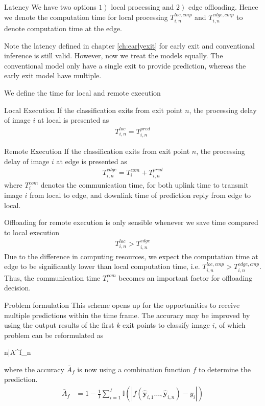 	\begin{enumdescript}
		\item[Latency]  We have two options $ \left.1 \right) $ local processing and $ \left.2\right) $ edge offloading. Hence we denote the computation time for local processing $ T_{i,n}^{loc,cmp} $ and $ T_{i,n}^{edge,cmp} $ to denote computation time at the edge. 
		
		Note the latency defined in chapter \ref{ch:earlyexit} for early exit and conventional inference is still valid. However, now we treat the models equally. The conventional model only have a single exit to provide prediction, whereas the early exit model have multiple.
		
		We define the time for local and remote execution

		\begin{enumdescript}
			\item[Local Execution] If the classification exits from exit point $ n $, the processing delay of image $ i $ at local is presented as
			\begin{align}
			T_{i,n}^{loc}= T_{i,n}^{pred}
			\end{align}
			\item[Remote Execution] If the classification exits from exit point $ n $, the processing delay of image $ i $ at edge is presented as
			\begin{align}
			T_{i,n}^{edge}=T_{i}^{com}+ T_{i,n}^{pred}
			\end{align}
			where $ T^{com}_i $ denotes the communication time, for both uplink time to transmit image $ i $ from local to edge, and downlink time of prediction reply from edge to local.
			
			Offloading for remote execution is only sensible whenever we save time compared to local execution
			\begin{align}
					T_{i,n}^{loc} > T_{i,n}^{edge}
			\end{align}
			Due to the difference in computing resources, we expect the computation time at edge to be significantly lower than local computation time, i.e. $ T_{i,n}^{loc,cmp} > T_{i,n}^{edge,cmp} $. Thus, the communication time $ T^{com}_i $ becomes an important factor for offloading decision.

		\end{enumdescript}
	
		\item[Problem formulation] 
		This scheme opens up for the opportunities to receive multiple predictions within the time frame. The accuracy may be improved by using the output results of the first $ k $ exit points to classify image $ i $, of which problem can be reformulated as
		\begin{maxi}
			{n}{\bar{A}^f_n}
			{}{}
		\end{maxi}
		where the accuracy $ \bar{A}_f $ is now using a combination function $ f $ to determine the prediction.
		\begin{align*}
		\bar{A}_f &= 1 - \frac{1}{I} \sum_{i=1}^{I}\mathbb{I}\left(\left|f\left(\mathbf{\hat{y}}_{i,1} \dots, \mathbf{\hat{y}}_{i,n}\right)-y_i\right|\right)
		\end{align*}
		

\end{enumdescript}
